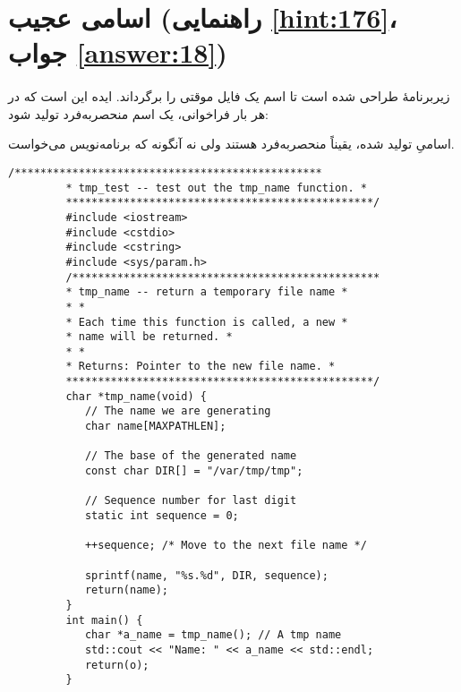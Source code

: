 \section[اسامی عجیب]{اسامی عجیب \protect{} (راهنمایی \ref{hint:176}، جواب \ref{answer:18})}
\paragraph{}\label{prog:58}
زیربرنامهٔ  طراحی شده است تا اسم یک فایل موقتی را برگرداند. ایده این است که در هر بار فراخوانی، یک اسم منحصربه‌فرد تولید شود: 

اسامیِ تولید شده، یقیناً منحصربه‌فرد هستند ولی نه آنگونه که برنامه‌نویس می‌خواست.

\begin{LTR}
    \begin{lstlisting}[style=C++Style]
         /************************************************
         * tmp_test -- test out the tmp_name function. *
         ************************************************/
         #include <iostream>
         #include <cstdio>
         #include <cstring>
         #include <sys/param.h>
         /************************************************
         * tmp_name -- return a temporary file name *
         * *
         * Each time this function is called, a new *
         * name will be returned. *
         * *
         * Returns: Pointer to the new file name. *
         ************************************************/
         char *tmp_name(void) {
         	// The name we are generating
         	char name[MAXPATHLEN];

         	// The base of the generated name
         	const char DIR[] = "/var/tmp/tmp";

         	// Sequence number for last digit
         	static int sequence = 0;

         	++sequence; /* Move to the next file name */

         	sprintf(name, "%s.%d", DIR, sequence);
         	return(name);
         }
         int main() {
         	char *a_name = tmp_name(); // A tmp name
         	std::cout << "Name: " << a_name << std::endl;
         	return(o);
         }
    \end{lstlisting}
\end{LTR}